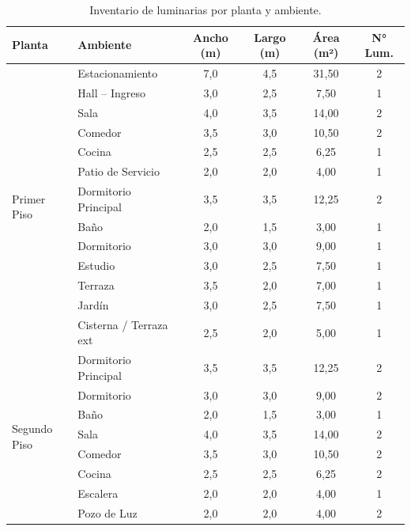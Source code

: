 \begin{table}[H]
\centering
\caption{Inventario de luminarias por planta y ambiente.}
\label{tab:inventario}
\begin{tabular}{llcccc}
\toprule
\textbf{Planta} & \textbf{Ambiente} & \textbf{Ancho (m)} & \textbf{Largo (m)} & \textbf{Área (m²)} & \textbf{N° Lum.} \\
\midrule
\multirow{13}{*}{Primer Piso}
 & Estacionamiento          & 7{,}0 & 4{,}5 & 31{,}50 & 2 \\
 & Hall – Ingreso           & 3{,}0 & 2{,}5 &  7{,}50 & 1 \\
 & Sala                     & 4{,}0 & 3{,}5 & 14{,}00 & 2 \\
 & Comedor                  & 3{,}5 & 3{,}0 & 10{,}50 & 2 \\
 & Cocina                   & 2{,}5 & 2{,}5 &  6{,}25 & 1 \\
 & Patio de Servicio        & 2{,}0 & 2{,}0 &  4{,}00 & 1 \\
 & Dormitorio Principal     & 3{,}5 & 3{,}5 & 12{,}25 & 2 \\
 & Baño                     & 2{,}0 & 1{,}5 &  3{,}00 & 1 \\
 & Dormitorio               & 3{,}0 & 3{,}0 &  9{,}00 & 1 \\
 & Estudio                  & 3{,}0 & 2{,}5 &  7{,}50 & 1 \\
 & Terraza                  & 3{,}5 & 2{,}0 &  7{,}00 & 1 \\
 & Jardín                   & 3{,}0 & 2{,}5 &  7{,}50 & 1 \\
 & Cisterna / Terraza ext   & 2{,}5 & 2{,}0 &  5{,}00 & 1 \\
\midrule
\multirow{8}{*}{Segundo Piso}
 & Dormitorio Principal     & 3{,}5 & 3{,}5 & 12{,}25 & 2 \\
 & Dormitorio               & 3{,}0 & 3{,}0 &  9{,}00 & 2 \\
 & Baño                     & 2{,}0 & 1{,}5 &  3{,}00 & 1 \\
 & Sala                     & 4{,}0 & 3{,}5 & 14{,}00 & 2 \\
 & Comedor                  & 3{,}5 & 3{,}0 & 10{,}50 & 2 \\
 & Cocina                   & 2{,}5 & 2{,}5 &  6{,}25 & 2 \\
 & Escalera                 & 2{,}0 & 2{,}0 &  4{,}00 & 1 \\
 & Pozo de Luz              & 2{,}0 & 2{,}0 &  4{,}00 & 2 \\

\end{tabular}
\end{table}
